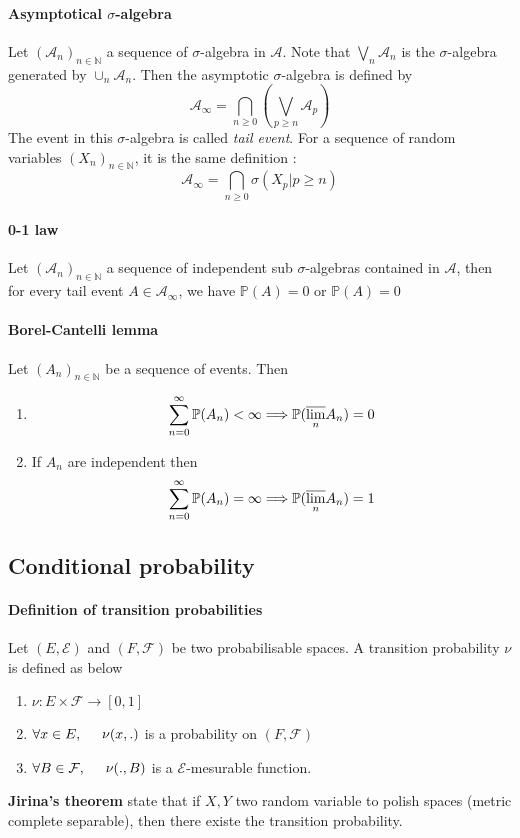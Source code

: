 \documentclass[a4paper,10pt]{article}
\begin{document}
\paragraph{Asymptotical $\sigma$-algebra} Let $(\mathcal{A}_n)_{n\in\mathbb{N}}$ a sequence of $\sigma$-algebra in $\mathcal{A}$. Note that $\bigvee_{n}\mathcal{A}_n$ is the $\sigma$-algebra generated by $\cup_n \mathcal{A}_n$. Then the asymptotic $\sigma$-algebra is defined by 
\[
\mathcal{A}_{\infty} = \bigcap_{n \geq 0}(\bigvee_{p\geq n} \mathcal{A}_p) 
\]
The event in this $\sigma$-algebra is called \textit{tail event}. For a sequence of random variables $(X_n)_{n\in \mathbb{N}}$, it is the same definition :
\[
\mathcal{A}_{\infty} = \bigcap_{n \geq 0} \sigma( X_p | {p\geq n}) 
\]
\paragraph{0-1 law} Let $(\mathcal{A}_n)_{n\in\mathbb{N}}$ a sequence of independent sub $\sigma$-algebras contained in $\mathcal{A}$, then for every tail event $A \in \mathcal{A}_{\infty}$, we have $\mathbb{P}(A) = 0 \text{ or }  \mathbb{P}(A) = 0  $ 
\paragraph{Borel-Cantelli lemma } Let $(A_n)_{n\in\mathbb{N}}$ be a sequence of events. Then 
\begin{enumerate}
 \item 
 \[
  \sum_{n=0}^{\infty} \mathbb{P}(A_n) <\infty  \Longrightarrow \mathbb{P}(\underset{n}{\varlimsup} A_n) =0
 \]
 \item If $A_n$ are independent then 
 \[
   \sum_{n=0}^{\infty} \mathbb{P}(A_n) = \infty  \Longrightarrow \mathbb{P}(\underset{n}{\varlimsup} A_n) =1
 \]
\end{enumerate}

\subsection{Conditional probability}
\paragraph{Definition of transition probabilities } Let $(E,\mathcal{E})$ and $(F,\mathcal{F})$ be two probabilisable spaces. A transition probability $\nu$ is defined as below
\begin{enumerate}
 \item $\nu : E\times \mathcal{F} \longrightarrow [0,1] $
 \item $\forall x\in E, \hspace{5mm} \nu(x,.)$ is a probability on $(F,\mathcal{F})$
 \item $\forall B\in \mathcal{F}, \hspace{5mm} \nu(.,B)$ is a $\mathcal{E}$-mesurable function.
\end{enumerate}
\textbf{Jirina's theorem} state that if $X,Y$ two random variable to polish spaces (metric complete separable), then there existe the transition probability.
\end{document}
